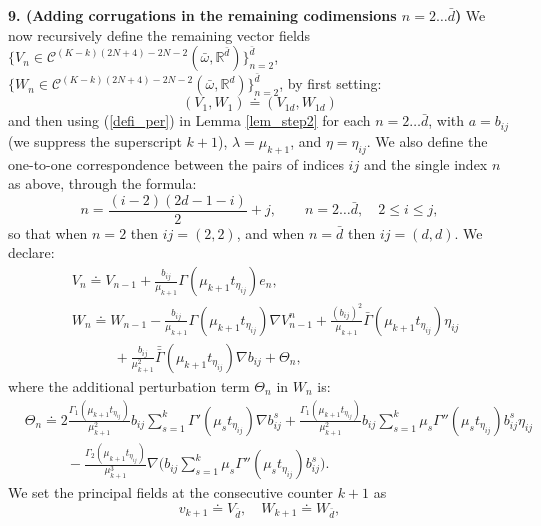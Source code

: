 \documentclass[reqno,twoside,11pt]{amsart}
\newcommand{\R}{\mathbb{R}}
\newcommand*{\dbar}[1]{\bar{\bar{#1}}}
\numberwithin{equation}{section}
\theoremstyle{plain}
\theoremstyle{definition}
\begin{document}
{\bf 9. (Adding corrugations in the remaining codimensions $n=2\ldots \bar d$)}
We now recursively define the remaining vector fields 
$\{V_{n}\in\mathcal{C}^{(K-k)(2N+4)-2N-2}(\bar\omega,\R^{\bar d})\}_{n=2}^{\bar d}$,
$\{W_{n}\in\mathcal{C}^{(K-k)(2N+4)-2N-2}(\bar\omega,\R^{d})\}_{n=2}^{\bar d}$,
by first setting:
$$(V_{1}, W_{1}) \doteq (V_{1d}, W_{1d})$$
and then using (\ref{defi_per}) in Lemma \ref{lem_step2} for each $n=2\ldots \bar d$,
with $a=b_{ij}$ (we suppress the superscript $k+1$), $\lambda =
\mu_{k+1}$, and $\eta=\eta_{ij}$. We also define the one-to-one correspondence between the pairs of indices $ij$ and the single index $n$ as above, through the formula:
\begin{equation}\label{nij}
n = \frac{(i-2)(2d-1-i)}{2}+j, \qquad n=2\ldots \bar d, \quad
2\leq i\leq j,
\end{equation}
so that when $n=2$ then $ij= (2,2)$, and when $n=\bar{d}$ then $ij= (d,d)$. We declare:
\begin{equation}\label{VWp}
\begin{split}
& V_n\doteq V_{n-1}+\frac{b_{ij}}{\mu_{k+1}}\Gamma(\mu_{k+1} t_{\eta_{ij}})e_n,
\\ & W_n \doteq W_{n-1} - \frac{b_{ij}}{\mu_{k+1}} \Gamma(\mu_{k+1} t_{\eta_{ij}})\nabla V^n_{n-1}
+ \frac{(b_{ij})^2}{\mu_{k+1}} \bar\Gamma(\mu_{k+1}
t_{\eta_{ij}})\eta_{ij} \\ &\qquad \quad + 
\frac{b_{ij}}{\mu_{k+1}^2} \dbar\Gamma(\mu_{k+1}
t_{\eta_{ij}})\nabla b_{ij} + \Theta_n,
\end{split}
\end{equation}
where the additional perturbation term $\Theta_n$ in $W_{n}$ is:
\begin{equation}\label{omegap}
\begin{split}
& \Theta_n \doteq 2\frac{\Gamma_{1}(\mu_{k+1}t_{\eta_{ij}})}{\mu_{k+1}^{2}} b_{ij}
\sum_{s=1}^k \Gamma'(\mu_{s}t_{\eta_{ij}})\nabla b_{ij}^s
+  \frac{\Gamma_{1}(\mu_{k+1}t_{\eta_{ij}})}{\mu_{k+1}^2} b_{ij}  
\sum_{s=1}^k\mu_{s}\Gamma''(\mu_{s}t_{\eta_{ij}})b_{ij}^s\eta_{ij}\\ & \qquad\quad - 
\frac{\Gamma_{2}(\mu_{k+1}t_{\eta_{ij}})}{\mu_{k+1}^3} \nabla\Big(b_{ij}  
\sum_{s=1}^k\mu_{s}\Gamma''(\mu_{s}t_{\eta_{ij}})b_{ij}^s\Big).
\end{split}
\end{equation}
We set the principal fields at the consecutive counter $k+1$ as
\begin{equation}\label{final_step}
v_{k+1} \doteq V_{\bar d}, \quad W_{k+1} \doteq W_{\bar d},
\end{equation}
\end{document}
